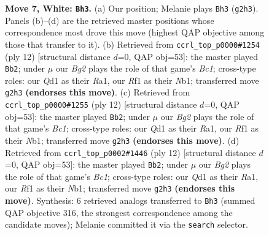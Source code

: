 \documentclass[11pt]{article}
\begin{document}
\begin{figure}[p]
\caption{\textbf{Move 7, White: \texttt{Bh3}.} (a) Our position; Melanie plays \texttt{Bh3} (\texttt{g2h3}). Panels (b)--(d) are the retrieved master positions whose correspondence most drove this move (highest QAP objective among those that transfer to it). (b) Retrieved from \texttt{ccrl\_top\_p0000\#1254} (ply 12) [structural distance $d$=0, QAP obj=53]: the master played \texttt{Bb2}; under $\mu$ our \emph{Bg2} plays the role of that game's \emph{Bc1}; cross-type roles: our \emph{Q}d1 as their \emph{R}a1, our \emph{R}f1 as their \emph{N}b1; transferred move \texttt{g2h3} \textbf{(endorses this move)}. (c) Retrieved from \texttt{ccrl\_top\_p0000\#1255} (ply 12) [structural distance $d$=0, QAP obj=53]: the master played \texttt{Bb2}; under $\mu$ our \emph{Bg2} plays the role of that game's \emph{Bc1}; cross-type roles: our \emph{Q}d1 as their \emph{R}a1, our \emph{R}f1 as their \emph{N}b1; transferred move \texttt{g2h3} \textbf{(endorses this move)}. (d) Retrieved from \texttt{ccrl\_top\_p0002\#1446} (ply 12) [structural distance $d$=0, QAP obj=53]: the master played \texttt{Bb2}; under $\mu$ our \emph{Bg2} plays the role of that game's \emph{Bc1}; cross-type roles: our \emph{Q}d1 as their \emph{R}a1, our \emph{R}f1 as their \emph{N}b1; transferred move \texttt{g2h3} \textbf{(endorses this move)}. Synthesis: 6 retrieved analogs transferred to \texttt{Bh3} (summed QAP objective 316, the strongest correspondence among the candidate moves); Melanie committed it via the \texttt{search} selector.}
\label{fig:thought-m12}
\end{figure}

\clearpage
\end{document}
